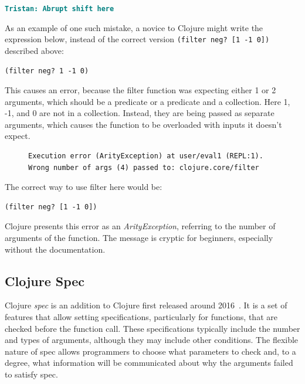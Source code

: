 \documentclass[12pt]{article}
\newcommand{\comment}[1]{{\bf \tt  {#1}}}
\newcommand{\emcomment}[1]{\textcolor{ForestGreen}{\comment{Elena: {#1}}}}
\newcommand{\tkcomment}[1]{\textcolor{Teal}{\comment{Tristan: {#1}}}}
\begin{document}
\tkcomment{Abrupt shift here}

As an example of one such mistake, a novice to Clojure might write the expression below, instead of the correct 
version \texttt{(filter neg? [1 -1 0])} described above:
\begin{verbatim}
(filter neg? 1 -1 0)
\end{verbatim}

This causes an error, because the filter function was expecting either 1 or 2 arguments,
 which should be a predicate or a predicate and a collection. Here 1, -1, and 0 are not in a collection. 
 Instead, they are being passed as separate arguments, which causes the function to be overloaded with inputs it doesn't expect.

 \begin{figure}[h]
	\centering
	\begin{lstlisting}[breaklines=true, basicstyle=\ttfamily]
Execution error (ArityException) at user/eval1 (REPL:1).
Wrong number of args (4) passed to: clojure.core/filter
	\end{lstlisting}
\end{figure}
The correct way to use filter here would be:
\begin{verbatim}
(filter neg? [1 -1 0])
\end{verbatim}
 Clojure presents this error as an {\it ArityException}, referring to the number of arguments of the function. 
 The message is cryptic for beginners, especially without the documentation.

\subsection{Clojure Spec}\label{subsec:spec}
Clojure \textit{spec} is an addition to Clojure first released around 2016~\cite{spec-overview}.
It is a set of features that allow setting specifications, particularly for functions, that are checked before the function call. 
These specifications typically include the number and types of arguments, although they may include other conditions.
The flexible nature of spec allows programmers to choose what parameters to check and, to a degree, what information will be communicated about why the arguments failed to satisfy spec.
\end{document}
